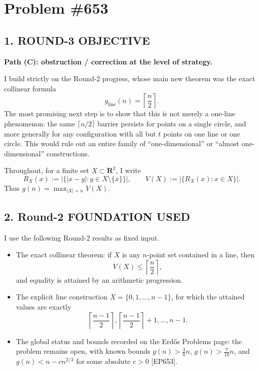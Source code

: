 \section{Problem \#653}

\subsection*{1. ROUND-3 OBJECTIVE}

\textbf{Path (C): obstruction / correction at the level of strategy.}

I build strictly on the Round-2 progress, whose main new theorem was the exact collinear formula
\[
 g_{\mathrm{line}}(n)=\left\lceil\frac{n}{2}\right\rceil.
\]
The most promising next step is to show that this is not merely a one-line phenomenon: the same \(\lceil n/2\rceil\) barrier persists for points on a single circle, and more generally for any configuration with all but \(t\) points on one line or one circle.  This would rule out an entire family of ``one-dimensional'' or ``almost one-dimensional'' constructions.

Throughout, for a finite set \(X\subset \mathbf{R}^2\), I write
\[
R_X(x):=\bigl|\{ |x-y|:y\in X\setminus\{x\}\}\bigr|,
\qquad
V(X):=\bigl|\{R_X(x):x\in X\}\bigr|.
\]
Thus \(g(n)=\max_{|X|=n}V(X)\).

\subsection*{2. Round-2 FOUNDATION USED}

I use the following Round-2 results as fixed input.

\begin{itemize}
\item The exact collinear theorem: if \(X\) is any \(n\)-point set contained in a line, then
\[
V(X)\le \left\lceil\frac{n}{2}\right\rceil,
\]
and equality is attained by an arithmetic progression.
\item The explicit line construction \(X=\{0,1,\dots,n-1\}\), for which the attained values are exactly
\[
\left\lceil\frac{n-1}{2}\right\rceil,\left\lceil\frac{n-1}{2}\right\rceil+1,\dots,n-1.
\]
\item The global status and bounds recorded on the Erd\H{o}s Problems page: the problem remains open, with known bounds \(g(n)>\tfrac38 n\), \(g(n)>\tfrac{7}{10}n\), and \(g(n)<n-cn^{2/3}\) for some absolute \(c>0\) [EP653].
\end{itemize}

